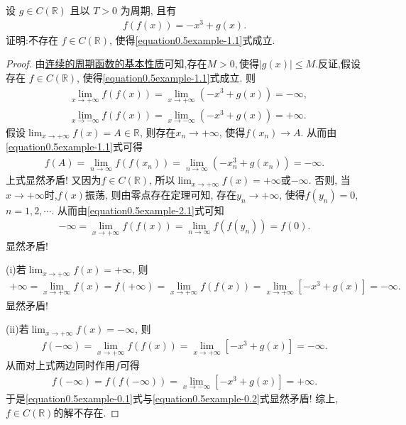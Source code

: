 \documentclass[../../main.tex]{subfiles}
\begin{document}
\begin{example}
设 \(g\in C(\mathbb{R})\) 且以 \(T > 0\) 为周期, 且有
\begin{align}
f(f(x))=-x^3 + g(x).\label{equation0.5example-1.1}
\end{align}
证明:不存在 \(f\in C(\mathbb{R})\), 使得\eqref{equation0.5example-1.1}式成立. 
\end{example}
\begin{proof}
由\hyperref[proposition:连续的周期函数的基本性质]{连续的周期函数的基本性质}可知,存在$M>0,$使得$|g(x)|\leqslant M.$反证,假设存在 \(f\in C(\mathbb{R})\), 使得\eqref{equation0.5example-1.1}式成立. 则
\begin{align}
&\underset{x\rightarrow +\infty}{\lim}f\left( f\left( x \right) \right) =\underset{x\rightarrow +\infty}{\lim}\left( -x^3+g\left( x \right) \right) =-\infty ,\label{equation0.5example-2.1}
\\
&\underset{x\rightarrow -\infty}{\lim}f\left( f\left( x \right) \right) =\underset{x\rightarrow -\infty}{\lim}\left( -x^3+g\left( x \right) \right) =+\infty .\label{equation0.5example-2.2}
\end{align}
假设\(\lim_{x\rightarrow +\infty}f(x) = A\in \mathbb{R}\), 则存在\(x_n\rightarrow +\infty\), 使得\(f(x_n)\rightarrow A\). 从而由\eqref{equation0.5example-1.1}式可得
\begin{align*}
f(A) = \lim_{n\rightarrow \infty}f(f(x_n)) = \lim_{n\rightarrow \infty}(-x_{n}^{3}+g(x_n)) = -\infty.
\end{align*}
上式显然矛盾! 又因为\(f\in C(\mathbb{R})\), 所以\(\lim_{x\rightarrow +\infty}f(x) = +\infty\)或\(-\infty\).
否则, 当\(x\rightarrow +\infty\)时,\(f(x)\)振荡, 则由零点存在定理可知, 存在\(y_n\rightarrow +\infty\), 使得\(f(y_n) = 0\), \(n = 1,2,\cdots\).
从而由\eqref{equation0.5example-2.1}式可知
\begin{align*}
-\infty = \lim_{x\rightarrow +\infty}f(f(x)) = \lim_{n\rightarrow \infty}f(f(y_n)) = f(0).
\end{align*}
显然矛盾!

(i)若\(\lim_{x\rightarrow +\infty}f(x) = +\infty\), 则
\begin{align*}
+\infty = \lim_{x\rightarrow +\infty}f(x) = f(+\infty) = \lim_{x\rightarrow +\infty}f(f(x)) = \lim_{x\rightarrow +\infty}[-x^3 + g(x)] = -\infty.
\end{align*}
显然矛盾!

(ii)若\(\lim_{x\rightarrow +\infty}f(x) = -\infty\), 则
\begin{align}
f(-\infty) = \lim_{x\rightarrow +\infty}f(f(x)) = \lim_{x\rightarrow +\infty}[-x^3 + g(x)] = -\infty. \label{equation0.5example-0.1}
\end{align}
从而对上式两边同时作用\(f\)可得
\begin{align}
f(-\infty) = f(f(-\infty)) = \lim_{x\rightarrow -\infty}[-x^3 + g(x)] = +\infty. \label{equation0.5example-0.2}
\end{align}
于是\eqref{equation0.5example-0.1}式与\eqref{equation0.5example-0.2}式显然矛盾!
综上,\(f\in C(\mathbb{R})\)的解不存在. 
\end{proof}
\end{document}
